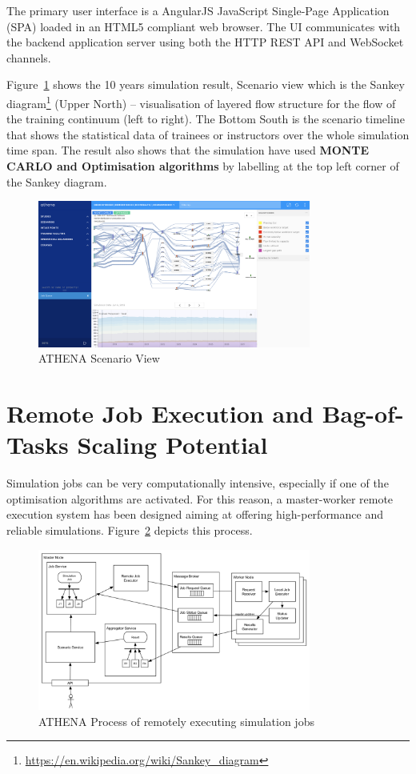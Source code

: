 The primary user interface is a AngularJS JavaScript Single-Page Application (SPA) loaded in an HTML5 compliant web browser. The UI communicates with the backend application server using both the HTTP REST API and WebSocket channels.

Figure~\ref{fig:scenarioScreen} shows the 10 years simulation result, Scenario view which is the Sankey diagram\footnote{\url{https://en.wikipedia.org/wiki/Sankey_diagram}} (Upper North) -- visualisation of layered flow structure for the flow of the training continuum (left to right). The Bottom South is the scenario timeline that shows the statistical data of trainees or instructors over the whole simulation time span. The result also shows that the simulation have used \textbf{MONTE CARLO and Optimisation algorithms} by labelling at the top left corner of the Sankey diagram.

\begin{figure}
\centering
\includegraphics[width=0.8\textwidth]{Figures/ATHENA_scenario_screen}
\decoRule
\caption[ATHENA Scenario View]{ATHENA Scenario View}
\label{fig:scenarioScreen}
\end{figure}

\section{Remote Job Execution and Bag-of-Tasks Scaling Potential}

Simulation jobs can be very computationally intensive, especially if one of the optimisation algorithms are activated. For this reason, a master-worker remote execution system has been designed aiming at offering high-performance and reliable simulations. Figure~\ref{fig:remoteJob} depicts this process.

\begin{figure}
\centering
\includegraphics[width=0.8\textwidth]{Figures/ATHENA_remote_job_exec}
\decoRule
\caption[ATHENA Remote Job Execution]{ATHENA Process of remotely executing simulation jobs}
\label{fig:remoteJob}
\end{figure}

